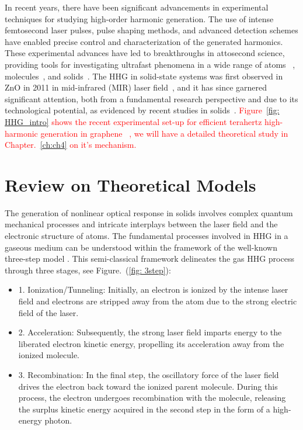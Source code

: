 In recent years, there have been significant advancements in experimental techniques for studying high-order harmonic generation. The use of intense femtosecond laser pulses, pulse shaping methods, and advanced detection schemes have enabled precise control and characterization of the generated harmonics. These experimental advances have led to breakthroughs in attosecond science, providing tools for investigating ultrafast phenomena in a wide range of atoms ~\cite{Goulielmakis2010,PhysRevLett.105.143002,PhysRevLett.106.123601}, molecules~\cite{Warrick2016,Reduzzi2016,PhysRevResearch.3.043222}, and solids~\cite{doi:10.1126/science.1260311, doi:10.1126/science.aag1268, Mashiko2016,Siegrist2019, vampa2017merge}.
The HHG in solid-state systems was first observed in ZnO in 2011 in mid-infrared (MIR) laser field~\cite{Ghimire2011}, and it has since garnered significant attention, both from a fundamental research perspective and due to its technological potential, as evidenced by recent studies in solids~\cite{Ghimire2019, Silva2019, Nakagawa2022,gorlach2022high, neufeld2023there}. \textcolor{red}{Figure~\ref{fig: HHG_intro} shows the recent experimental set-up for efficient terahertz high-harmonic generation in graphene ~\cite{hafez2018extremely, kovalev2021electrical}, we will have a detailed theoretical study in Chapter.~\ref{ch:ch4} on it's mechanism.}


\section{Review on Theoretical Models}
The generation of nonlinear optical response in solids involves complex quantum mechanical processes and intricate
interplays between the laser field and the electronic structure of atoms. The fundamental processes involved in \gls{HHG} in a gaseous medium can
be understood within the framework of the well-known three-step model  \cite{corkum1993plasma,
	lewenstein1994theory}. This semi-classical framework delineates the gas HHG process through three stages, see Figure.~(\ref{fig: 3step}):
\begin{itemize}
	\item 1. Ionization/Tunneling: Initially, an electron is ionized by the intense laser field and electrons are stripped away from the atom due to the strong electric field of the laser.

	\item 2. Acceleration: Subsequently, the strong laser field imparts energy to the liberated electron kinetic energy, propelling its acceleration away from the ionized molecule.

	\item 3. Recombination: In the final step, the oscillatory force of the laser field drives the electron back toward the ionized parent molecule. During this process, the electron undergoes recombination with the molecule, releasing the surplus kinetic energy acquired in the second step in the form of a high-energy photon.\\
\end{itemize}

